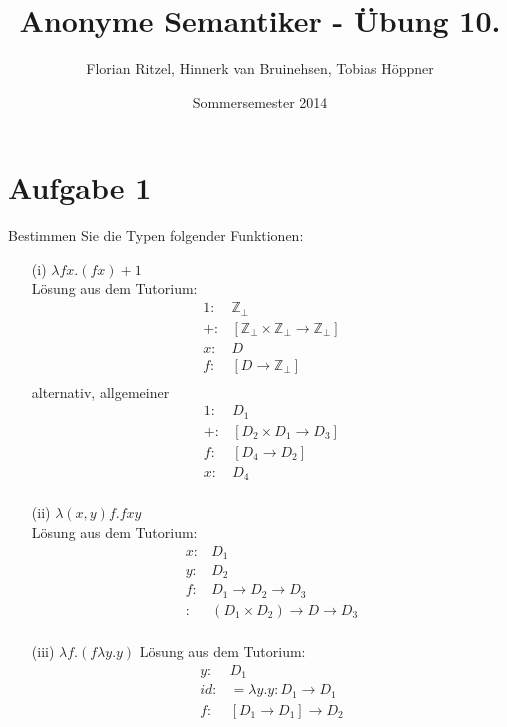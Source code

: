 \documentclass[ngerman,a4paper]{report}
\author{Florian Ritzel, Hinnerk van Bruinehsen, Tobias Höppner}
\title{Anonyme Semantiker - Übung 10. }
\date{Sommersemester 2014}
\renewcommand{\maketitle}{}
\begin{document}
\maketitle
\section*{Aufgabe 1}
Bestimmen Sie die Typen folgender Funktionen:
\begin{itemize}
\item[(i)]$\lambda fx.(fx)+1$\\
Lösung aus dem Tutorium:
\begin{align*}
	1:& \mathbb{Z}_\perp\\
	+:& [\mathbb{Z}_\perp \times \mathbb{Z}_\perp \rightarrow \mathbb{Z}_\perp]\\
	x:& D\\
	f:& [D \rightarrow \mathbb{Z}_\perp]\\
\end{align*}
alternativ, allgemeiner
\begin{align*}
	1:& D_1\\
	+:& [D_2 \times D_1 \rightarrow D_3]\\
	f:& [D_4 \rightarrow D_2]\\
	x:& D_4\\
\end{align*}
\item[(ii)] $\lambda(x,y)f.fxy$\\
Lösung aus dem Tutorium:
\begin{align*}
	x :& D_1\\
	y :& D_2\\
	f :& D_1 \rightarrow D_2 \rightarrow D_3\\
	:& (D_1 \times D_2) \rightarrow D \rightarrow D_3\\
\end{align*}
\item[(iii)] $\lambda f.(f\lambda y.y)$
Lösung aus dem Tutorium:
\begin{align*}
	y :& D_1\\
	id :&= \lambda y.y : D_1 \rightarrow D_1\\
	f :& [D_1 \rightarrow D_1] \rightarrow D_2\\
\end{align*}
\end{itemize}
\end{document}
